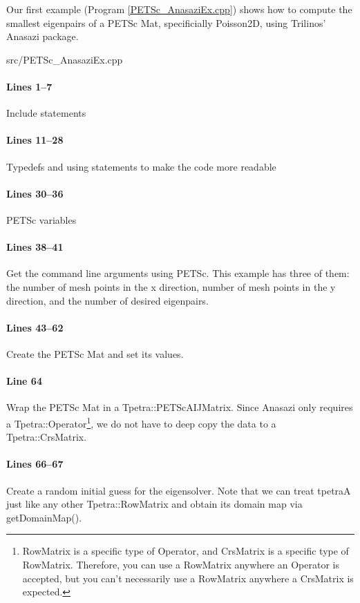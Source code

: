 Our first example (Program \ref{PETSc_AnasaziEx.cpp}) shows how to compute
the smallest eigenpairs of a PETSc Mat, specificially Poisson2D, using Trilinos'
Anasazi package.

\begin{lstinputlisting}[caption=PETSc\_AnasaziEx.cpp,label=PETSc_AnasaziEx.cpp]{src/PETSc_AnasaziEx.cpp}
\end{lstinputlisting}

\paragraph{Lines 1--7}
Include statements

\paragraph{Lines 11--28}
Typedefs and using statements to make the code more readable

\paragraph{Lines 30--36}
PETSc variables

\paragraph{Lines 38--41}
Get the command line arguments using PETSc.  This example has three of them: the
number of mesh points in the x direction, number of mesh points in the y
direction, and the number of desired eigenpairs.

\paragraph{Lines 43--62}
Create the PETSc Mat and set its values.

\paragraph{Line 64}
Wrap the PETSc Mat in a Tpetra::PETScAIJMatrix.  Since Anasazi only requires a
Tpetra::Operator\footnote{RowMatrix is a specific type of Operator, and
CrsMatrix is a specific type of RowMatrix.  Therefore, you can use a RowMatrix
anywhere an Operator is accepted, but you can't necessarily use a RowMatrix
anywhere a CrsMatrix is expected.}, we do not have to deep copy the data to a
Tpetra::CrsMatrix.

\paragraph{Lines 66--67}
Create a random initial guess for the eigensolver.  Note that we can treat
tpetraA just like any other Tpetra::RowMatrix and obtain its domain map via
getDomainMap().

